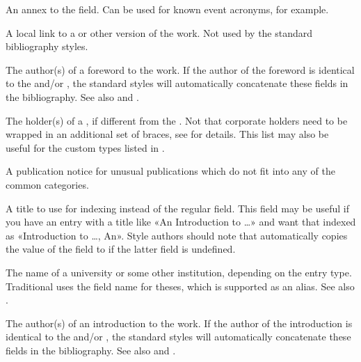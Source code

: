 \documentclass{ltxdockit}[2011/03/25]
\newcommand*{\biblatex}{\sty{biblatex}\xspace}
\begin{document}
\begin{fieldlist}

An annex to the  field. Can be used for known event acronyms, for example.


A local link to a  or other version of the work. Not used by the standard bibliography styles.


The author(s) of a foreword to the work. If the author of the foreword is identical to the  and\slash or , the standard styles will automatically concatenate these fields in the bibliography. See also  and .


The holder(s) of a , if different from the . Not that corporate holders need to be wrapped in an additional set of braces, see  for details. This list may also be useful for the custom types listed in .


A publication notice for unusual publications which do not fit into any of the common categories.


A title to use for indexing instead of the regular  field. This field may be useful if you have an entry with a title like «An Introduction to \dots» and want that indexed as «Introduction to \dots, An». Style authors should note that \biblatex automatically copies the value of the  field to  if the latter field is undefined.


The name of a university or some other institution, depending on the entry type. Traditional \bibtex uses the field name  for theses, which is supported as an alias. See also .


The author(s) of an introduction to the work. If the author of the introduction is identical to the  and\slash or , the standard styles will automatically concatenate these fields in the bibliography. See also  and .


\end{fieldlist}
\end{document}
